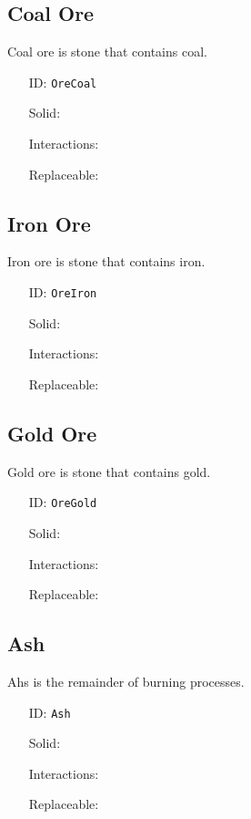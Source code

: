 \subsection{Coal Ore}\label{subsec:blocks_coal ore}
Coal ore is stone that contains coal.
\newline
\begin{itemize}[nosep]
    \item[ID:] \texttt{OreCoal}
    \item[Solid:]  \Checkmark \item[Interactions:]  \XSolidBrush \item[Replaceable:]  \XSolidBrush
\end{itemize}

\subsection{Iron Ore}\label{subsec:blocks_iron ore}
Iron ore is stone that contains iron.
\newline
\begin{itemize}[nosep]
    \item[ID:] \texttt{OreIron}
    \item[Solid:]  \Checkmark \item[Interactions:]  \XSolidBrush \item[Replaceable:]  \XSolidBrush
\end{itemize}

\subsection{Gold Ore}\label{subsec:blocks_gold ore}
Gold ore is stone that contains gold.
\newline
\begin{itemize}[nosep]
    \item[ID:] \texttt{OreGold}
    \item[Solid:]  \Checkmark \item[Interactions:]  \XSolidBrush \item[Replaceable:]  \XSolidBrush
\end{itemize}

\subsection{Ash}\label{subsec:blocks_ash}
Ahs is the remainder of burning processes.
\newline
\begin{itemize}[nosep]
    \item[ID:] \texttt{Ash}
    \item[Solid:]  \Checkmark \item[Interactions:]  \XSolidBrush \item[Replaceable:]  \XSolidBrush
\end{itemize}

